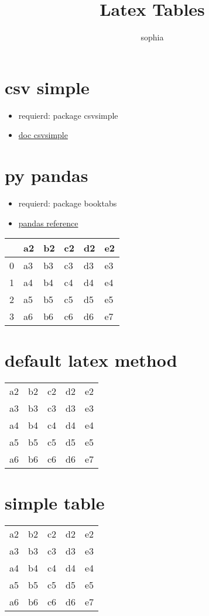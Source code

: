 \documentclass[10pt]{article}
\title{Latex Tables}
\date{}
\author{sophia}
\begin{document}
 
\maketitle
\tableofcontents
 
\section{csv simple}
\begin{itemize}
    \item requierd: package csvsimple
    \item \href{https://mirror.dogado.de/tex-archive/macros/latex/contrib/csvsimple/csvsimple.pdf}{doc csvsimple}
\end{itemize}

\section{py pandas}
\begin{itemize}
    \item requierd: package booktabs
    \item \href{https://pandas.pydata.org/pandas-docs/stable/reference/api/pandas.DataFrame.to_latex.html}{pandas reference}
\end{itemize}
\begin{tabular}{llllll}
    \toprule
    {} &  a2 &  b2 &  c2 &  d2 &  e2 \\
    \midrule
    0 &  a3 &  b3 &  c3 &  d3 &  e3 \\
    1 &  a4 &  b4 &  c4 &  d4 &  e4 \\
    2 &  a5 &  b5 &  c5 &  d5 &  e5 \\
    3 &  a6 &  b6 &  c6 &  d6 &  e7 \\
    \bottomrule
    \end{tabular}

\section{default latex method}
\begin{center}
    \begin{tabular}{ c c c c c }
    a2 & b2 & c2 & d2 & e2 \\ 
    a3 & b3 & c3 & d3 & e3 \\ 
    a4 & b4 & c4 & d4 & e4 \\ 
    a5 & b5 & c5 & d5 & e5 \\ 
    a6 & b6 & c6 & d6 & e7 \\ 
    \end{tabular} 
\end{center}

\section{simple table}
\begin{center}
    \begin{tabular}{ | c| c| c| c| c | }
     \hline
    a2 & b2 & c2 & d2 & e2 \\ 
    a3 & b3 & c3 & d3 & e3 \\ 
    a4 & b4 & c4 & d4 & e4 \\ 
    a5 & b5 & c5 & d5 & e5 \\ 
    a6 & b6 & c6 & d6 & e7 \\ 
    \hline
    \end{tabular}
\end{center}
 
\end{document}
